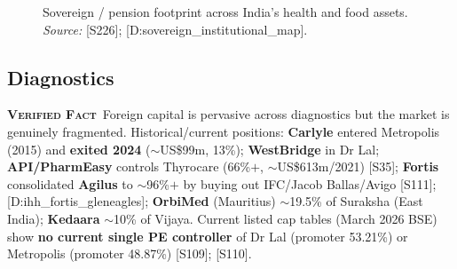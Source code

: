 \documentclass[11pt,a4paper]{article}
\newcommand{\VF}{\textcolor{vfcol}{\textsc{\textbf{Verified Fact}}}}
\newcommand{\cs}[1]{\textnormal{[#1]}}
\begin{document}
\begin{figure}[htbp]
\centering
\small
\setlength{\tabcolsep}{6pt}
\caption{Sovereign / pension footprint across India's health and food assets. \textit{Source:} \cs{S226}; \cs{D:sovereign\_institutional\_map}.}
\label{fig:dg4footprint}
\end{figure}

\subsection{Diagnostics}

\VF\ Foreign capital is pervasive across diagnostics but the market is genuinely fragmented. Historical/current positions: \textbf{Carlyle} entered Metropolis (2015) and \textbf{exited 2024} ($\sim$US\$99m, 13\%); \textbf{WestBridge} in Dr Lal; \textbf{API/PharmEasy} controls Thyrocare (66\%$+$, $\sim$US\$613m/2021) \cs{S35}; \textbf{Fortis} consolidated \textbf{Agilus} to $\sim$96\%$+$ by buying out IFC/Jacob Ballas/Avigo \cs{S111}; \cs{D:ihh\_fortis\_gleneagles}; \textbf{OrbiMed} (Mauritius) $\sim$19.5\% of Suraksha (East India); \textbf{Kedaara} $\sim$10\% of Vijaya. Current listed cap tables (March 2026 BSE) show \textbf{no current single PE controller} of Dr Lal (promoter 53.21\%) or Metropolis (promoter 48.87\%) \cs{S109}; \cs{S110}.
\end{document}
